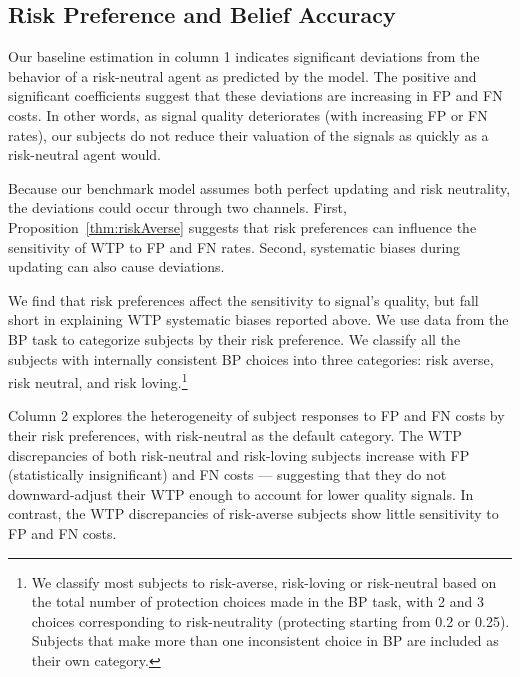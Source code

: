 \documentclass[12pt,a4paper]{article}
\begin{document}
\subsection{Risk Preference and Belief Accuracy}

Our baseline estimation in column 1 indicates significant deviations from the behavior of a risk-neutral agent as predicted by the model. The positive and significant coefficients suggest that these deviations are increasing in FP and FN costs. In other words, as signal quality deteriorates (with increasing FP or FN rates), our subjects do not reduce their valuation of the signals as quickly as a risk-neutral agent would.

Because our benchmark model assumes both perfect updating and risk neutrality, the deviations could occur through two channels. First, Proposition~\ref{thm:riskAverse} suggests that risk preferences can influence the sensitivity of WTP to FP and FN rates. Second, systematic biases during updating can also cause deviations. 

We find that risk preferences affect the sensitivity to signal's quality, but fall short in explaining WTP systematic biases reported above. We use data from the BP task to categorize subjects by their risk preference. We classify all the subjects with internally consistent BP choices into three categories: risk averse, risk neutral, and risk loving.\footnote{We classify most subjects to risk-averse, risk-loving or risk-neutral based on the total number of protection choices made in the BP task, with 2 and 3 choices corresponding to risk-neutrality (protecting starting from 0.2 or 0.25).  Subjects that make more than one inconsistent choice in BP are included as their own category.} 

Column 2 explores the heterogeneity of subject responses to FP and FN costs by their risk preferences, with risk-neutral as the default category. The WTP discrepancies of both risk-neutral and risk-loving subjects increase with FP (statistically insignificant) and FN costs --- suggesting that they do not downward-adjust their WTP enough to account for lower quality signals. In contrast, the WTP discrepancies of risk-averse subjects show little sensitivity to FP and FN costs.  
\end{document}
